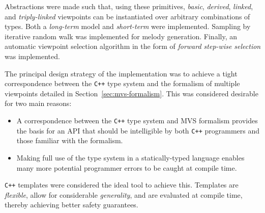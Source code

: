 \documentclass[12pt,a4paper,twoside,openright]{report}
\newcommand{\sref}[1]{Section~\ref{#1}}
\begin{document}
Abstractions were made such that, using these primitives, \emph{basic},
\emph{derived}, \emph{linked}, and \emph{triply-linked} viewpoints can be
instantiated over arbitrary combinations of types. Both a \emph{long-term} model
and \emph{short-term} were implemented.  Sampling by iterative random walk was
implemented for melody generation. Finally, an automatic viewpoint selection
algorithm in the form of \emph{forward step-wise selection}
\cite{pearce2005construction} was implemented.

The principal design strategy of the implementation was to achieve a tight
correspondence between the \texttt{C++} type system and the formalism of
multiple viewpoints detailed in \sref{sec:mvs-formalism}. This was
considered desirable for two main reasons:
\begin{itemize}
  \item A correspondence between the \texttt{C++} type system and MVS formalism
    provides the basis for an API that should be intelligible by both
    \texttt{C++} programmers and those familiar with the formalism.
  \item Making full use of the type system in a statically-typed language 
    enables many more potential programmer errors to be caught at compile time.
\end{itemize}

\texttt{C++} templates were considered the ideal tool to achieve this. Templates
are \emph{flexible}, allow for considerable \emph{generality}, and are evaluated
at compile time, thereby achieving better safety guarantees.
\end{document}
